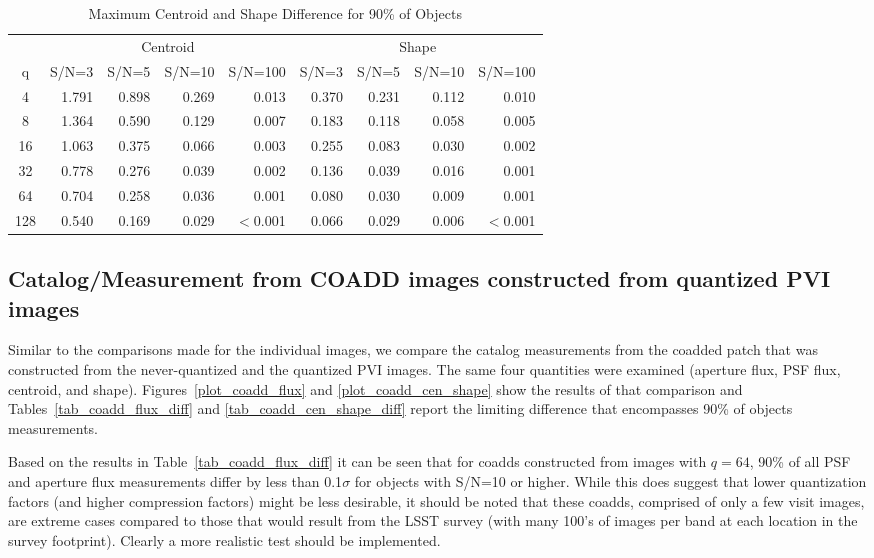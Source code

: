 \begin{table}
\caption{Maximum Centroid and Shape Difference for 90\% of Objects}
\centering
\begin{tabular}[]{c|rrrr|rrrr}
\hline
     &  \multicolumn{4}{c}{Centroid}  & \multicolumn{4}{c}{Shape} \\
 q   &  S/N=3 & S/N=5 & S/N=10 & S/N=100 & S/N=3 & S/N=5 & S/N=10 & S/N=100  \\
\hline
   4 & 1.791 & 0.898 & 0.269  & 0.013 &  0.370 & 0.231 & 0.112  & 0.010 \\
   8 & 1.364 & 0.590 & 0.129  & 0.007 &  0.183 & 0.118 & 0.058  & 0.005 \\
  16 & 1.063 & 0.375 & 0.066  & 0.003 &  0.255 & 0.083 & 0.030  & 0.002 \\
  32 & 0.778 & 0.276 & 0.039  & 0.002 &  0.136 & 0.039 & 0.016  & 0.001 \\
  64 & 0.704 & 0.258 & 0.036  & 0.001 &  0.080 & 0.030 & 0.009  & 0.001 \\
 128 & 0.540 & 0.169 & 0.029  & $<$0.001 &  0.066 & 0.029 & 0.006  & $<$0.001 \\
\hline
\end{tabular}
\label{tab_se_cen_shape_diff}
\end{table}



\clearpage

\subsection{Catalog/Measurement from COADD images constructed from quantized PVI images}

Similar to the comparisons made for the individual images, we compare the catalog measurements from the coadded patch
that was constructed from the never-quantized and the quantized PVI images.  The same four quantities were examined 
(aperture flux, PSF flux, centroid, and shape).  Figures~\ref{plot_coadd_flux} and \ref{plot_coadd_cen_shape} show
the results of that comparison and Tables~\ref{tab_coadd_flux_diff} and \ref{tab_coadd_cen_shape_diff} report the 
limiting difference that encompasses 90\% of objects measurements.

Based on the results in Table~\ref{tab_coadd_flux_diff} it can be seen that for coadds constructed from images 
with $q=64$, 90\% of all PSF and aperture flux measurements differ by less than 0.1$\sigma$ for objects 
with S/N=10 or higher.  While this does suggest that lower quantization factors (and higher compression factors)
might be less desirable, it should be noted that these coadds, comprised of only a few visit images, are extreme 
cases compared to those that would result from the LSST survey (with many 100's of images per band at each location
in the survey footprint).  Clearly a more realistic test should be implemented.

